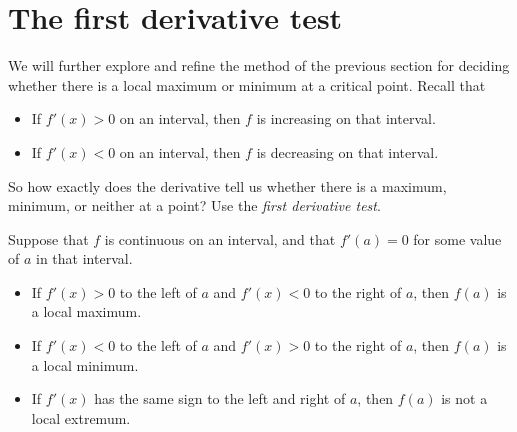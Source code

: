 \documentclass{ximera}
\begin{document}
\section{The first derivative test}

We will further explore and refine the method of the previous section for deciding whether there is a
local maximum or minimum at a critical point.  Recall that
\begin{itemize}
	\item If $f'(x) >0$ on an interval, then $f$ is increasing on that interval.
	\item If $f'(x) <0$ on an interval, then $f$ is decreasing on that interval.
\end{itemize}

So how exactly does the derivative tell us whether there is a maximum,
minimum, or neither at a point? Use the \textit{first derivative test}.

\begin{theorem}\label{T:fdt}
Suppose that $f$ is continuous on an interval, and that $f'(a)=0$ for
some value of $a$ in that interval.
\begin{itemize}
\item If $f'(x)>0$ to the left of $a$ and $f'(x)<0$ to the right of
  $a$, then $f(a)$ is a local maximum.
\item If $f'(x)<0$ to the left of $a$ and $f'(x)>0$ to the right of
  $a$, then $f(a)$ is a local minimum.
\item If $f'(x)$ has the same sign to the left and right of $a$,
  then $f(a)$ is not a local extremum.
\end{itemize}
\end{theorem}
\end{document}
